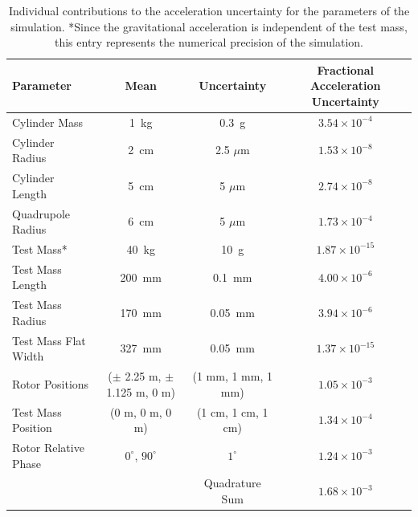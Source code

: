 \documentclass[superscriptaddress, twocolumn, prd]{revtex4-1}
\begin{document}
\begin{widetext}
\begingroup
\setlength{\tabcolsep}{10pt} %
\renewcommand{\arraystretch}{1.5} %

\begin{table}[h!]
\begin{center}
\begin{tabular}{ |l|c|c|c| }
\hline
 Parameter & Mean & Uncertainty & Fractional Acceleration Uncertainty\\
 \hline

Cylinder Mass & 1~kg & 0.3~g & $3.54\times10^{-4}$\\
Cylinder Radius & 2~cm & 2.5 $\mu$m & $1.53\times10^{-8}$\\
Cylinder Length & 5~cm & 5 $\mu$m & $2.74\times10^{-8}$\\
Quadrupole Radius & 6~cm & 5 $\mu$m &$1.73\times10^{-4}$\\
Test Mass* & 40~kg & 10~g & $1.87\times10^{-15}$\\
Test Mass Length & 200~mm & 0.1~mm& $4.00\times10^{-6}$\\
Test Mass Radius & 170~mm & 0.05~mm& $3.94\times10^{-6}$\\
Test Mass Flat Width & 327~mm & 0.05~mm&$1.37\times10^{-15}$\\
Rotor Positions & ($\pm$ 2.25 m, $\pm$ 1.125 m, 0 m) & (1 mm, 1 mm, 1 mm) &$1.05\times10^{-3}$\\
Test Mass Position & (0 m, 0 m, 0 m) & (1 cm, 1 cm, 1 cm) &$1.34\times10^{-4}$\\
Rotor Relative Phase & $0^\circ$, $90^\circ$ & $1^\circ$ & $1.24\times10^{-3}$\\
 \hline
 \hline
& &Quadrature Sum  &$1.68\times10^{-3}$\\
\hline
 \end{tabular}
 \caption{Individual contributions to the acceleration uncertainty for the parameters of the simulation. *Since the gravitational acceleration is independent of the test mass, this entry represents the numerical precision of the simulation.}\label{uncert}
 \end{center}

\end{table}
\endgroup
\end{widetext}


\end{document}
